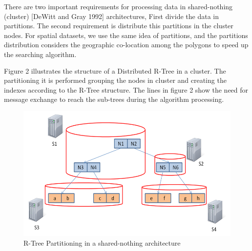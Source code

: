 There are two important requirements for processing data in shared-nothing (cluster) [DeWitt and Gray 1992] architectures, First divide the data in partitions. The second requirement is distribute this partitions in the cluster nodes. For spatial datasets, we use the same idea of partitions, and the partitions distribution considers the geographic co-location among the polygons to speed up the searching algorithm.

Figure 2 illustrates the structure of a Distributed R-Tree in a cluster. The partitioning it is performed grouping the nodes in cluster and creating the indexes according to the R-Tree structure. The lines in figure 2 show the need for message exchange to reach the sub-trees during the algorithm processing.

\begin{figure}[ht]
\centering
\includegraphics[width=.5\textwidth]{r-tree-partiotioning.png}
\caption{R-Tree Partitioning in a shared-nothing architecture}
\label{fig: R-Tree Partitioning in a shared-nothing architecture}
\end{figure}

